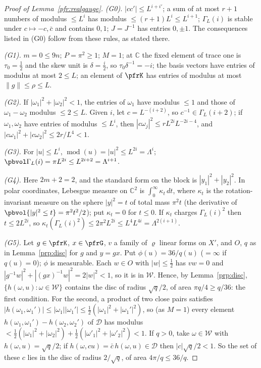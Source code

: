 \documentclass[10pt]{amsart}
\theoremstyle{definition}
\theoremstyle{remark}
\newcommand{\C}{\mathbb C}
\begin{document}
\begin{proof}[Proof of Lemma~\ref{pfr:realgauge}]
\emph{(G0).} $|cc'|\le L^{i+i'}$; a sum of at most $r+1$ numbers of modulus $\le L^i$ has modulus
$\le(r+1)L^i\le L^{i+1}$; $\Gamma_L(i)$ is stable under $c\mapsto-c,\bar c$ and contains $0,1$; $J=J^{-1}$ has
entries $0,\pm1$. The consequences listed in (G0) follow from these rules, as stated there.

\emph{(G1).} $m=0\le9n$; $P=\pi^2\ge1$; $M=1$; at $\C$ the fixed element of trace one is $\tau_0=\frac12$ and
the skew unit is $\delta=\frac i2$, so $\tau_0\delta^{-1}=-i$; the basis vectors have entries of modulus at
most $2\le L$; an element of $\pfrK$ has entries of modulus at most $\|g\|\le\rho\le L$.

\emph{(G2).} If $|\omega_1|^2+|\omega_2|^2<1$, the entries of $\omega_1$ have modulus $\le1$ and those of
$\omega_1-\omega_2$ modulus $\le2\le L$. Given $i$, let $c=L^{-(i+2)}$, so $c^{-1}\in\Gamma_L(i+2)$; if
$\omega_1,\omega_2$ have entries of modulus $\le L^i$, then $|c\omega_j|^2\le rL^{2i}L^{-2i-4}$, and
$|c\omega_1|^2+|c\omega_2|^2\le2r/L^4<1$.

\emph{(G3).} For $|u|\le L^i$, $\operatorname{mod}(u)=|u|^2\le L^{2i}=\Lambda^i$; $\pbvol\Gamma_L(i)=\pi L^{2i}\le
L^{2i+2}=\Lambda^{i+1}$.

\emph{(G4).} Here $2m+2=2$, and the standard form on the block is $|y_1|^2+|y_2|^2$. In polar coordinates,
Lebesgue measure on $\C^2$ is $\int_0^\infty\kappa_t\,dt$, where $\kappa_t$ is the rotation-invariant
measure on the sphere $|y|^2=t$ of total mass $\pi^2t$ (the derivative of $\pbvol\{|y|^2\le t\}=\pi^2t^2/2$);
put $\kappa_t=0$ for $t\le0$. If $\kappa_t$ charges $\Gamma_L(i)^2$ then $t\le2L^{2i}$, so
$\kappa_t(\Gamma_L(i)^2)\le2\pi^2L^{2i}\le L^4L^{4i}=\Lambda^{2(i+1)}$.

\emph{(G5).} Let $g\in\pfrK$, $x\in\pfrG$, $v$ a family of $\varrho$ linear forms on $X'$, and $O$, $q$ as in
Lemma~\ref{prp:disc} for $g$ and $y=gx$. Put $\phi(u)=36/q(u)$ ($=\infty$ if $q(u)=0$); $\phi$ is measurable.
Each $w\in O$ with $|w|\le\frac12$ has $vw=0$ and $|g^{-1}w|^2+|(gx)^{-1}w|^2=2|w|^2<1$, so it is in
$\mathcal W$. Hence, by Lemma~\ref{prp:disc}, $\{h(\omega,u):\omega\in\mathcal W\}$ contains the disc of radius
$\sqrt q/2$, of area $\pi q/4\ge q/36$: the first condition. For the second, a product of two close pairs
satisfies $|h(\omega_1,\omega_1')|\le|\omega_1||\omega_1'|\le\frac12(|\omega_1|^2+|\omega_1'|^2)$, so (as $M=1$) every
element $h(\omega_1,\omega_1')-h(\omega_2,\omega_2')$ of $\mathcal D$ has modulus
$<\frac12(|\omega_1|^2+|\omega_2|^2)+\frac12(|\omega'_1|^2+|\omega'_2|^2)<1$. If $q>0$, take $\omega\in\mathcal W$ with
$h(\omega,u)=\sqrt q/2$; if $h(\omega,cu)=\bar c\,h(\omega,u)\in\mathcal D$ then $|c|\sqrt q/2<1$. So the set of these $c$ lies in
the disc of radius $2/\sqrt q$, of area $4\pi/q\le36/q$.


\end{proof}
\end{document}
